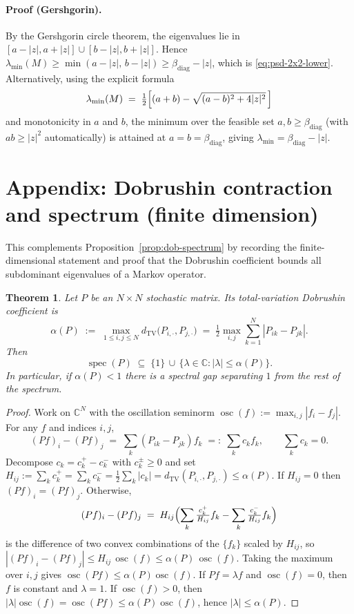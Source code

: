 \documentclass[11pt]{amsart}
\theoremstyle{plain}
\newtheorem{theorem}{Theorem}[section]
\theoremstyle{definition}
\theoremstyle{remark}
\begin{document}
\paragraph{Proof (Gershgorin).}
By the Gershgorin circle theorem, the eigenvalues lie in $[a-|z|,a+|z|]\cup[b-|z|,b+|z|]$. Hence $\lambda_{\min}(M)\ge \min(a-|z|,\,b-|z|)\ge \beta_{\mathrm{diag}}-|z|$, which is \eqref{eq:psd-2x2-lower}. Alternatively, using the explicit formula
\[
  \lambda_{\min}(M)\;=\;\tfrac12\Bigl[(a+b)-\sqrt{(a-b)^2+4|z|^2}\,\Bigr]
\]
and monotonicity in $a$ and $b$, the minimum over the feasible set $a,b\ge\beta_{\mathrm{diag}}$ (with $ab\ge |z|^2$ automatically) is attained at $a=b=\beta_{\mathrm{diag}}$, giving $\lambda_{\min}=\beta_{\mathrm{diag}}-|z|$.
\section{Appendix: Dobrushin contraction and spectrum (finite dimension)}
This complements Proposition~\ref{prop:dob-spectrum} by recording the finite-dimensional statement and proof that the Dobrushin coefficient bounds all subdominant eigenvalues of a Markov operator.
\begin{theorem}
Let $P$ be an $N\times N$ stochastic matrix. Its total-variation Dobrushin coefficient is
\[
  \alpha(P)\;:=\;\max_{1\le i,j\le N} d_{\mathrm{TV}}\bigl(P_{i,\cdot},P_{j,\cdot}\bigr)
  \;=\;\tfrac12\max_{i,j}\sum_{k=1}^N |P_{ik}-P_{jk}|.
\]
Then
\[
  \operatorname{spec}(P)\;\subseteq\;\{1\}\,\cup\,\{\lambda\in\mathbb{C}: |\lambda|\le \alpha(P)\}.
\]
In particular, if $\alpha(P)<1$ there is a spectral gap separating $1$ from the rest of the spectrum.
\end{theorem}

\begin{proof}
Work on $\mathbb{C}^N$ with the oscillation seminorm $\operatorname{osc}(f):=\max_{i,j}|f_i-f_j|$. For any $f$ and indices $i,j$,
\[
  (Pf)_i-(Pf)_j\;=\;\sum_k (P_{ik}-P_{jk}) f_k\;=:\;\sum_k c_k f_k,\qquad \sum_k c_k=0.
\]
Decompose $c_k=c_k^+-c_k^-$ with $c_k^\pm\ge 0$ and set $H_{ij}:=\sum_k c_k^+=\sum_k c_k^- = \tfrac12\sum_k |c_k| = d_{\mathrm{TV}}(P_{i,\cdot},P_{j,\cdot})\le \alpha(P)$. If $H_{ij}=0$ then $(Pf)_i=(Pf)_j$. Otherwise,
\[
  (Pf)_i-(Pf)_j\;=\;H_{ij}\Bigl(\sum_k \tfrac{c_k^+}{H_{ij}} f_k - \sum_k \tfrac{c_k^-}{H_{ij}} f_k\Bigr)
\]
is the difference of two convex combinations of the $\{f_k\}$ scaled by $H_{ij}$, so $|(Pf)_i-(Pf)_j|\le H_{ij}\,\operatorname{osc}(f)\le \alpha(P)\,\operatorname{osc}(f)$. Taking the maximum over $i,j$ gives $\operatorname{osc}(Pf)\le \alpha(P)\operatorname{osc}(f)$. If $Pf=\lambda f$ and $\operatorname{osc}(f)=0$, then $f$ is constant and $\lambda=1$. If $\operatorname{osc}(f)>0$, then $|\lambda|\operatorname{osc}(f)=\operatorname{osc}(Pf)\le \alpha(P)\operatorname{osc}(f)$, hence $|\lambda|\le \alpha(P)$.
\end{proof}
\end{document}
